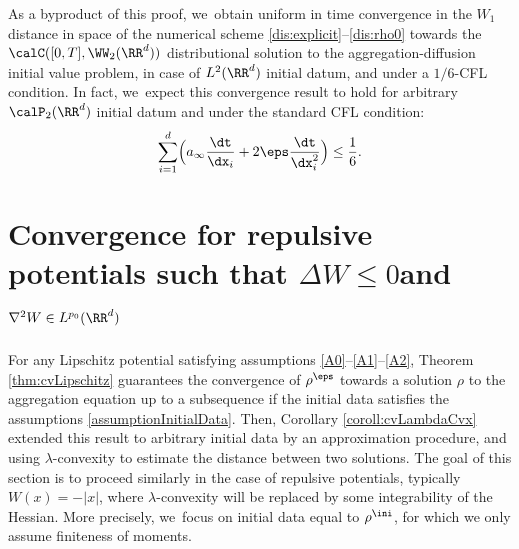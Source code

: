 \begin{remark}
As a byproduct of this proof, we~obtain uniform in time convergence in the $W_1$ distance in space of the numerical scheme \eqref{dis:explicit}--\eqref{dis:rho0} towards the $\calC([0,T], \WW_2(\RR^d))$ distributional solution to the aggregation-diffusion initial value problem, in case of $L^2(\RR^d)$ initial datum, and under a $1/6$-CFL condition. In fact, we~expect this convergence result to hold for arbitrary $\calP_2(\RR^d)$ initial datum and under the standard CFL condition:
\[
\sum_{i=1}^d \Bigl(a_\infty \frac{\dt}{\dx_i} + 2\eps \frac{\dt}{\dx_i^2}\Bigr) \leq \frac 16.
\]
\end{remark}

\section{Convergence for repulsive potentials such that
\texorpdfstring{$\Delta W \leq 0$\nobreakspace and\nobreakspace $\nabla^2 W \in L^{p_0}(\RR^d)$}{titlesection2}}\label{section:repulsive}

For any Lipschitz potential satisfying assumptions \eqref{A0}--\eqref{A1}--\eqref{A2}, Theorem \ref{thm:cvLipschitz} guarantees the convergence of $\rho^\eps$ towards a solution $\rho$ to the aggregation equation up to a subsequence if the initial data satisfies the assumptions \eqref{assumptionInitialData}. Then, Corollary \ref{coroll:cvLambdaCvx} extended this result to arbitrary initial data by an approximation procedure, and using $\lambda$-convexity to estimate the distance between two solutions. The goal of this section is to proceed similarly in the case of repulsive potentials, typically $W(x) = -|x|$, where $\lambda$-convexity will be replaced by some integrability of the Hessian. More precisely, we~focus on initial data equal to $\rho^{\ini}$, for which we only assume finiteness of moments.

